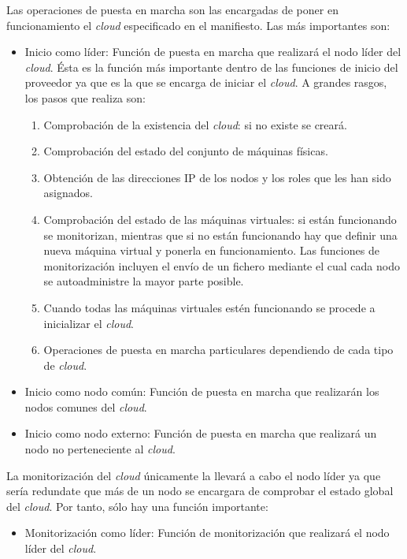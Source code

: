 Las operaciones de puesta en marcha son las encargadas de poner en funcionamiento el \emph{cloud} especificado en el manifiesto. Las más importantes son:
\begin{itemize}
\item Inicio como líder: Función de puesta en marcha que realizará el nodo líder del \emph{cloud}. Ésta es la función más importante dentro de las funciones de inicio del proveedor ya que es la que se encarga de iniciar el \emph{cloud}. A grandes rasgos, los pasos que realiza son:

   \begin{enumerate}
   \item Comprobación de la existencia del \emph{cloud}: si no existe se creará.
   \item Comprobación del estado del conjunto de máquinas físicas.
   \item Obtención de las direcciones IP de los nodos y los roles que les han sido asignados.
   \item Comprobación del estado de las máquinas virtuales: si están funcionando se monitorizan, mientras que si no están funcionando hay que definir una nueva máquina virtual y ponerla en funcionamiento. Las funciones de monitorización incluyen el envío de un fichero mediante el cual cada nodo se autoadministre la mayor parte posible.
   \item Cuando todas las máquinas virtuales estén funcionando se procede a inicializar el \emph{cloud}.
   \item Operaciones de puesta en marcha particulares dependiendo de cada tipo de \emph{cloud}.
   \end{enumerate}

\item Inicio como nodo común: Función de puesta en marcha que realizarán los nodos comunes del \emph{cloud}.
\item Inicio como nodo externo: Función de puesta en marcha que realizará un nodo no perteneciente al \emph{cloud}.
\end{itemize}

La monitorización del \emph{cloud} únicamente la llevará a cabo el nodo líder ya que sería redundate que más de un nodo se encargara de comprobar el estado global del \emph{cloud}. Por tanto, sólo hay una función importante:
\begin{itemize}
\item Monitorización como líder: Función de monitorización que realizará el nodo líder del \emph{cloud}.
\end{itemize}

